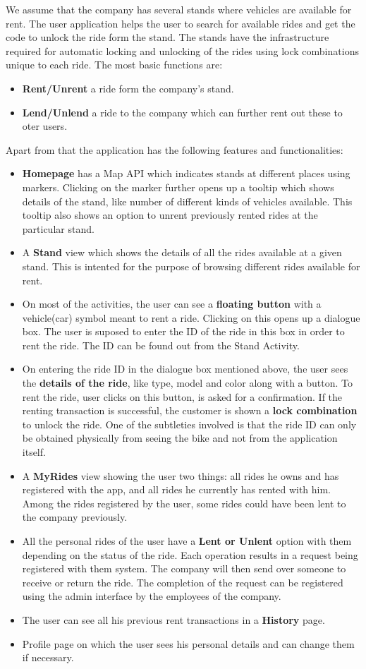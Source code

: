 \documentclass[paper=a4, fontsize=11pt]{scrartcl}
\numberwithin{equation}{section}		%
\numberwithin{figure}{section}			%
\numberwithin{table}{section}			%
\begin{document}
We assume that the company has several stands where vehicles are available for rent. The user application helps the user to search for available rides and get the code to unlock the ride form the stand. The stands have the infrastructure required for automatic locking and unlocking of the rides using lock combinations unique to each ride. The most basic functions are:
\begin{itemize}
	\item \textbf{Rent/Unrent} a ride form the company's stand.
	\item \textbf{Lend/Unlend} a ride to the company which can further rent out these to oter users.
\end{itemize}
Apart from that the application has the following features and functionalities:
\begin{itemize}
\item \textbf{Homepage} has a Map API which indicates stands at different places using markers. Clicking on the marker further opens up a tooltip which shows details of the stand, like number of different kinds of vehicles available. This tooltip also shows an option to unrent previously rented rides at the particular stand.
\item A \textbf{Stand} view which shows the details of all the rides available at a given stand. This is intented for the purpose of browsing different rides available for rent.
\item On most of the activities, the user can see a \textbf{floating button} with a vehicle(car) symbol meant to rent a ride. Clicking on this opens up a dialogue box. The user is suposed to enter the ID of the ride in this box in order to rent the ride. The ID can be found out from the Stand Activity. 
\item On entering the ride ID in the dialogue box mentioned above, the user sees the \textbf{details of the ride}, like type, model and color along with a  button. To rent the ride, user clicks on this button, is asked for a confirmation. If the renting transaction is successful, the customer is shown a \textbf{lock combination} to unlock the ride. One of the subtleties involved is that the ride ID can only be obtained physically from seeing the bike and not from the application itself.
\item A \textbf{MyRides} view showing the user two things: all rides he owns and has registered with the app, and all rides he currently has rented with him. Among the rides registered by the user, some rides could have been lent to the company previously.
\item All the personal rides of the user have a \textbf{Lent or Unlent} option with them depending on the status of the ride. Each operation results in a request being registered with them system. The company will then send over someone to receive or return the ride. The completion of the request can be registered using the admin interface by the employees of the company.
\item The user can see all his previous rent transactions in a \textbf{History} page.
\item {Profile} page on which the user sees his personal details and can change them if necessary.
\end{itemize}
\end{document}
